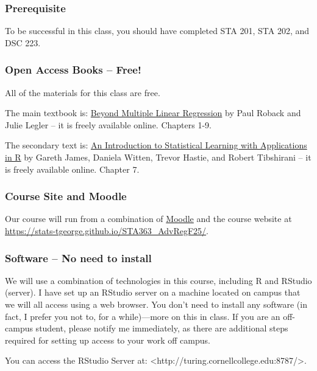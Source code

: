 \documentclass[
  letterpaper,
  DIV=11,
  numbers=noendperiod]{scrartcl}
\begin{document}
\subsubsection{Prerequisite}\label{prerequisite}

To be successful in this class, you should have completed STA 201, STA
202, and DSC 223.

\subsubsection{Open Access Books -- Free!}\label{open-access-books-free}

All of the materials for this class are free.

The main textbook is:
\href{https://bookdown.org/roback/bookdown-BeyondMLR/}{Beyond Multiple
Linear Regression} by Paul Roback and Julie Legler -- it is freely
available online. Chapters 1-9.

The secondary text is:
\href{https://hastie.su.domains/ISLR2/ISLRv2_corrected_June_2023.pdf.download.html}{An
Introduction to Statistical Learning with Applications in R} by Gareth
James, Daniela Witten, Trevor Hastie, and Robert Tibshirani -- it is
freely available online. Chapter 7.

\subsubsection{Course Site and Moodle}\label{course-site-and-moodle}

Our course will run from a combination of
\href{https://moodle.cornellcollege.edu/course/view.php?id=9443}{Moodle}
and the course website at
\url{https://stats-tgeorge.github.io/STA363_AdvRegF25/}.

\subsubsection{Software -- No need to
install}\label{software-no-need-to-install}

We will use a combination of technologies in this course, including R
and RStudio (server). I have set up an RStudio server on a machine
located on campus that we will all access using a web browser. You don't
need to install any software (in fact, I prefer you not to, for a
while)---more on this in class. If you are an off-campus student, please
notify me immediately, as there are additional steps required for
setting up access to your work off campus.

You can access the RStudio Server at:
\textless{}http://turing.cornellcollege.edu:8787/\textgreater.
\end{document}
